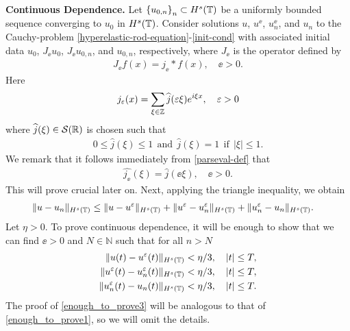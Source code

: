 \textbf{Continuous Dependence.}
Let $\left\{ u_{0, n} \right\}_n \subset H^s(\mathbb{T})$ be a uniformly bounded
sequence converging to $u_0$ in $H^s(\mathbb{T})$.
Consider solutions $u $, $u^\ee$, $u^\ee_n$, and $u_n$ to the 
Cauchy-problem
\eqref{hyperelastic-rod-equation}-\eqref{init-cond}
with associated initial data $u_0$, $J_\ee u_0$,
$J_\ee u_{0,n}$, and $u_{0,n}$, respectively, where $J_\ee$ is the operator 
defined by
\begin{equation}
\label{0'u}
\begin{split}
J_\ee f(x) = j_\ee * f(x), \quad \ee>0.
\end{split}
\end{equation}
%
%
Here
\begin{equation}
\begin{split}
j_\varepsilon (x) = \sum_{\xi \in \mathbb{Z}}
\widehat{j}(\varepsilon \xi) e^{i \xi x}, \quad \varepsilon > 0
\label{parseval-def}
\end{split}
\end{equation}
where $\widehat{j}(\xi) \in \mathcal{S}(\mathbb{R})$ is chosen such that 
%
\begin{equation}
\label{0u}
\begin{split}
	 0 \le \widehat{j}(\xi) \le 1  \ \ \text{and} \ \
 \widehat{j}(\xi) = 1 \ \ \text{if} \ \ |\xi| \le 1.
\end{split}
\end{equation}
%
%
%
%
%
%
%
%
%
%
We remark that it follows immediately from \eqref{parseval-def} that
\begin{equation}
\begin{split}
	\widehat{j_\ee}(\xi)  = \widehat{j }(\ee \xi), \quad \ee > 0.
\label{widehat-def}
\end{split}
\end{equation}
This will prove
crucial later on.
%
Next, applying
the triangle inequality, we obtain
%
%
\begin{equation*}
\begin{split}
\|u - u_n\|_{H^s(\mathbb{T})}
& \le \|u - u^\varepsilon\|_{H^s(\mathbb{T})}
+ \|u^\varepsilon - u^{\varepsilon}_n \|_{H^s(\mathbb{T}) }
+  \|u^{\varepsilon}_n - u_n \|_{H^s(\mathbb{T})}.
\end{split}
\end{equation*}
%
%
Let $\eta > 0$. To prove continuous dependence, it will be enough to show that 
we can find $\ee > 0$ and $N \in \mathbb{N}$ such that for all $n > N$ 
\begin{align}
	 \|u(t) - u^\varepsilon(t)\|_{H^s(\mathbb{T})}
	& < \eta/3, \quad |t| \le T,
\label{enough_to_prove1}
\\
  \|u^\varepsilon(t) - u^{\varepsilon}_n(t)
\|_{H^s(\mathbb{T})} & < \eta/3, \quad |t| \le T,
\label{enough_to_prove2}
\\
  \|u^{\varepsilon}_n(t) - u_n(t) \|_{H^s(\mathbb{T})} & < \eta/3, \quad |t| \le T.
\label{enough_to_prove3}
\end{align}
%
%
The proof of \eqref{enough_to_prove3} will be analogous to that of 
\eqref{enough_to_prove1}, so we will omit the details.
%
%
%
%

